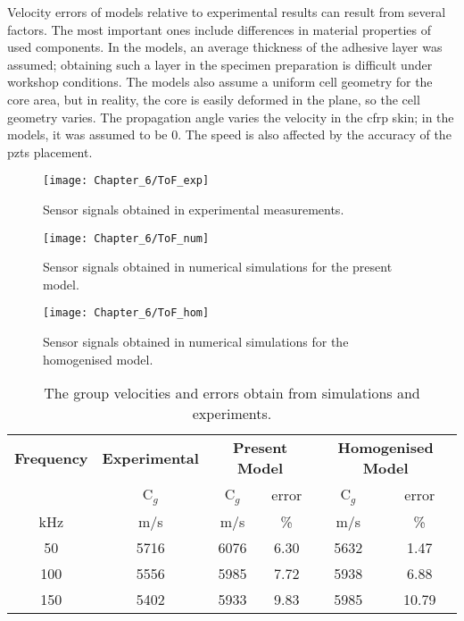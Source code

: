 Velocity errors of models relative to experimental results can result from several factors. The most important ones include differences in material properties of used components. In the models, an average thickness of the adhesive layer was assumed; obtaining such a layer in the specimen preparation is difficult under workshop conditions. The models also assume a uniform cell geometry for the core area, but in reality, the core is easily deformed in the plane, so the cell geometry varies. The propagation angle varies the velocity in the \ac{cfrp} skin; in the models, it was assumed to be 0. The speed is also affected by the accuracy of the \acp{pzt} placement. 
\begin{figure}[H]
	\begin{center}
		\texttt{[image: Chapter\_6/ToF\_exp]}
	\end{center}
	\caption{Sensor signals obtained in experimental measurements.}
	\label{fig:ToF_exp}
\end{figure}
\begin{figure}[H]
	\begin{center}
		\texttt{[image: Chapter\_6/ToF\_num]}
	\end{center}
	\caption{Sensor signals obtained in numerical simulations for the present model.}
	\label{fig:ToF_num}
\end{figure}
\begin{figure}[H]
	\begin{center}
		\texttt{[image: Chapter\_6/ToF\_hom]}
	\end{center}
	\caption{Sensor signals obtained in numerical simulations for the homogenised model.}
	\label{fig:ToF_hom}
\end{figure}

\begin{table}[H]
	\small
	\tabcolsep=0.25cm
	\centering
	\caption{\label{tab:group_velocity} The group velocities and errors obtain from simulations and experiments.}
	\begin{tabular}{cccccc}
		\toprule
		\textbf{Frequency} & \textbf{Experimental} &\multicolumn{2}{c}{\textbf{Present Model}} & \multicolumn{2}{c}{\textbf{Homogenised Model}}\\
		& C\(_g\) & C\(_g\) & error & C\(_g\) & error\\
		kHz & m/s & m/s & \% & m/s & \%\\
		\midrule
		50  & 5716& 6076& 6.30& 5632& 1.47\\
		100 & 5556& 5985& 7.72& 5938& 6.88\\
		150 & 5402& 5933& 9.83& 5985& 10.79\\
		\bottomrule
	\end{tabular}
\end{table}

